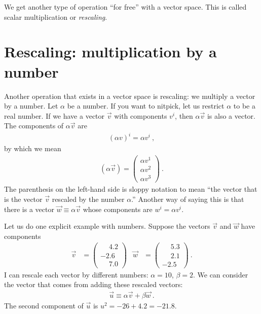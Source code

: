We get another type of operation ``for free'' with a vector space. This is called scalar multiplication or \emph{rescaling}.



\section{Rescaling: multiplication by a number}

Another operation that exists in a vector space is rescaling: we multiply a vector by a number. 
Let $\alpha$ be a number. If you want to nitpick, let us restrict $\alpha$ to be a real number. If we have a vector $\vec{v}$ with components $v^i$, then $\alpha \vec{v}$ is also a vector. The components of $\alpha \vec{v}$ are
\begin{align}
    (\alpha v)^i = \alpha v^i \ ,
\end{align}
by which we mean
\begin{align}
    (\alpha\vec{v})
    =
    \begin{pmatrix}
        \alpha v^1 \\
        \alpha v^2 \\
        \alpha v^3 
    \end{pmatrix} \ .
\end{align}
The parenthesis on the left-hand side is sloppy notation to mean ``the vector that is the vector $\vec{v}$ rescaled by the number  $\alpha$.'' Another way of saying this is that there is a vector $\vec{w}\equiv \alpha\vec{v}$ whose components are $w^i = \alpha v^i$.

\begin{example}
Let us do one explicit example with numbers. Suppose the vectors $\vec{v}$ and $\vec{w}$ have components
\begin{align}
    \vec{v} &=
    \begin{pmatrix}
    \phantom{+}4.2\\
    -2.6\\
    \phantom{+}7.0        
    \end{pmatrix}
    &
    \vec{w} &=
    \begin{pmatrix}
    \phantom{+}5.3\\
    \phantom{+}2.1\\
    -2.5        
    \end{pmatrix} \ .
\end{align}
I can rescale each vector by different numbers: $\alpha = 10$, $\beta = 2$. We can consider the vector that comes from adding these rescaled vectors:
\begin{align}
    \vec{u} \equiv \alpha \vec{v} + \beta \vec{w} \ .
\end{align}
The second component of $\vec{u}$ is $u^2 = -26 + 4.2 = -21.8$.
\end{example}

